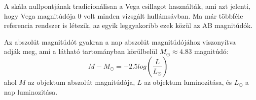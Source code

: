 \documentclass[../main.tex]{subfiles}
\begin{document}
A skála nullpontjának tradicionálisan a Vega csillagot használták, ami azt jelenti, hogy Vega magnitúdója 0 volt minden vizsgált hullámsávban. Ma már többféle referencia rendszer is létezik,
az egyik leggyakoribb ezek közül az AB magnitúdók.

Az abszolút magnitúdót gyakran a nap abszolút magnitúdójához viszonyítva adják meg, ami a látható tartományban körülbelül $M_\odot \approx 4.83$ magnitúdó:
\begin{equation}
    M - M_\odot = -2.5 log \left( \frac{L}{L_\odot} \right)
\end{equation}
ahol $M$ az objektum abszolút magnitúdója, $L$ az objektum luminozitása, és $L_\odot$ a nap luminozitása.
\end{document}
